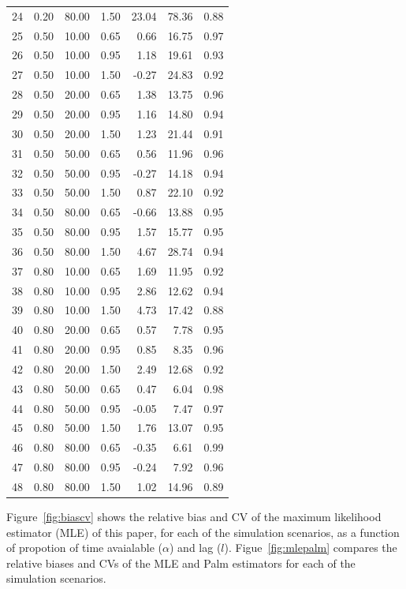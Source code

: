 \documentclass[useAMS, usenatbib, referee]{biom}\usepackage[]{graphicx}\usepackage[]{color}
\begin{document}
\begin{table}[ht]
\begin{tabular}{rrrrrrr}
  24 & 0.20 & 80.00 & 1.50 & 23.04 & 78.36 & 0.88 \\ 
  25 & 0.50 & 10.00 & 0.65 & 0.66 & 16.75 & 0.97 \\ 
  26 & 0.50 & 10.00 & 0.95 & 1.18 & 19.61 & 0.93 \\ 
  27 & 0.50 & 10.00 & 1.50 & -0.27 & 24.83 & 0.92 \\ 
  28 & 0.50 & 20.00 & 0.65 & 1.38 & 13.75 & 0.96 \\ 
  29 & 0.50 & 20.00 & 0.95 & 1.16 & 14.80 & 0.94 \\ 
  30 & 0.50 & 20.00 & 1.50 & 1.23 & 21.44 & 0.91 \\ 
  31 & 0.50 & 50.00 & 0.65 & 0.56 & 11.96 & 0.96 \\ 
  32 & 0.50 & 50.00 & 0.95 & -0.27 & 14.18 & 0.94 \\ 
  33 & 0.50 & 50.00 & 1.50 & 0.87 & 22.10 & 0.92 \\ 
  34 & 0.50 & 80.00 & 0.65 & -0.66 & 13.88 & 0.95 \\ 
  35 & 0.50 & 80.00 & 0.95 & 1.57 & 15.77 & 0.95 \\ 
  36 & 0.50 & 80.00 & 1.50 & 4.67 & 28.74 & 0.94 \\ 
  37 & 0.80 & 10.00 & 0.65 & 1.69 & 11.95 & 0.92 \\ 
  38 & 0.80 & 10.00 & 0.95 & 2.86 & 12.62 & 0.94 \\ 
  39 & 0.80 & 10.00 & 1.50 & 4.73 & 17.42 & 0.88 \\ 
  40 & 0.80 & 20.00 & 0.65 & 0.57 & 7.78 & 0.95 \\ 
  41 & 0.80 & 20.00 & 0.95 & 0.85 & 8.35 & 0.96 \\ 
  42 & 0.80 & 20.00 & 1.50 & 2.49 & 12.68 & 0.92 \\ 
  43 & 0.80 & 50.00 & 0.65 & 0.47 & 6.04 & 0.98 \\ 
  44 & 0.80 & 50.00 & 0.95 & -0.05 & 7.47 & 0.97 \\ 
  45 & 0.80 & 50.00 & 1.50 & 1.76 & 13.07 & 0.95 \\ 
  46 & 0.80 & 80.00 & 0.65 & -0.35 & 6.61 & 0.99 \\ 
  47 & 0.80 & 80.00 & 0.95 & -0.24 & 7.92 & 0.96 \\ 
  48 & 0.80 & 80.00 & 1.50 & 1.02 & 14.96 & 0.89 \\ 
   \hline
\end{tabular}
\end{table}



Figure~\ref{fig:biascv} shows the relative bias and CV of the maximum likelihood estimator (MLE) of this paper, for each of the simulation scenarios, as a function of propotion of time avaialable ($\alpha$) and lag ($l$). Figue~\ref{fig:mlepalm} compares the relative biases and CVs of the MLE and Palm estimators for each of the simulation scenarios.
\end{document}
